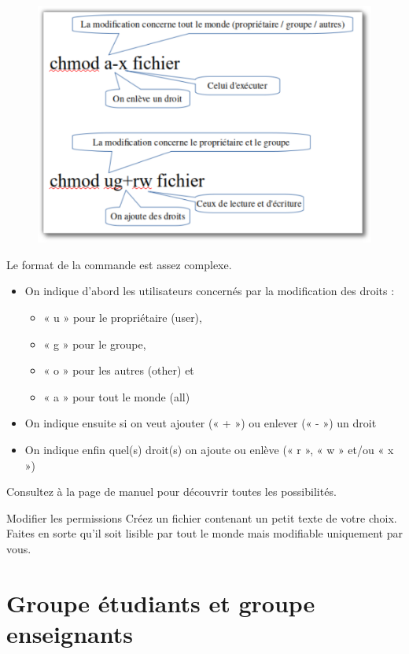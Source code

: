 \documentclass[a4paper,11pt]{style-esi/td}
\begin{document}
			\begin{figure}
				\vspace{-1em}
				\includegraphics[width=.4\textwidth]{image/chmod.pdf}
				\vspace{-2em}
			\end{figure}
			Le format de la commande est assez complexe. 
			\begin{itemize}
			\item
				On indique d'abord les utilisateurs concernés par la modification des droits :
				\begin{itemize}
				\item « u » pour le propriétaire (user), 
				\item « g » pour le groupe, 
				\item « o » pour les autres (other) et
				\item « a » pour tout le monde (all)
				\end{itemize}  
			\item
				On indique ensuite si on veut ajouter (« + ») 
				ou enlever (« - ») un droit
			\item 
				On indique enfin quel(s) droit(s) on ajoute ou enlève 
				(« r », « w » et/ou « x »)
			\end{itemize}

			Consultez à la page de manuel pour découvrir toutes les possibilités.

			\begin{Exercice}{Modifier les permissions}
				Créez un fichier  
				contenant un petit texte de votre choix.
				Faites en sorte qu'il soit lisible par tout le monde
				mais modifiable uniquement par vous.
			\end{Exercice}

	\section{Groupe étudiants et groupe enseignants}
\end{document}
